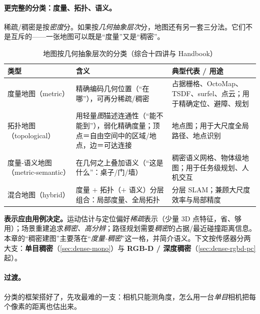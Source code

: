 \paragraph{更完整的分类：度量、拓扑、语义。}
稀疏/稠密是按\emph{密度}分。如果按\emph{几何抽象层次}分，地图还有另一套三分法\cite{carlone2026handbook}。它们不是互斥的——一张地图可以既是“度量”又是“稠密”。

\begin{table}[H]\centering\small
\caption{地图按几何抽象层次的分类（综合十四讲\cite{gaoxiang2019slam14}与 Handbook\cite{carlone2026handbook}）}
\label{tab:dense-maptypes}
\begin{tabular}{p{} p{} p{}}
\toprule
类型 & 含义 & 典型代表 / 用途 \\
\midrule
度量地图（metric） & 精确编码几何位置（“在哪”），可再分稀疏/稠密 & 占据栅格、OctoMap、TSDF、surfel、点云；用于精确定位、避障、规划 \\
拓扑地图（topological） & 用轻量\emph{图}描述连通性（“能不能到”），弱化精确度量；顶点＝自由空间中的区域/地点，边＝可达连接 & 地点图；用于大尺度全局路径、地点识别 \\
度量-语义地图（metric-semantic） & 在几何之上叠加语义（“这是什么”：桌子/门/墙） & 稠密语义网格、物体级地图；用于任务级规划、人机交互 \\
混合地图（hybrid） & 度量 $+$ 拓扑（$+$ 语义）分层组合：局部度量、全局拓扑 & 分层 SLAM；兼顾大尺度效率与局部精度 \\
\bottomrule
\end{tabular}
\end{table}

\begin{insight}
\textbf{表示应由用例决定。}运动估计与定位偏好\emph{稀疏}表示（少量 3D 点特征，省、够用）；场景重建追求\emph{稠密、高分辨}；路径规划需要\emph{稠密}的占据/最近碰撞距离信息\cite{carlone2026handbook}。本章的“稠密建图”主要落在“\emph{度量-稠密}”这一格，并简介语义。下文按传感器分两大支：\textbf{单目稠密}（\cref{sec:dense-mono}）与 \textbf{RGB-D / 深度稠密}（\cref{sec:dense-rgbd-pc} 起）。
\end{insight}

\paragraph{过渡。}
分类的框架搭好了，先攻最难的一支：相机只能测角度，怎么用一台\emph{单目}相机把每个像素的距离也估出来。

